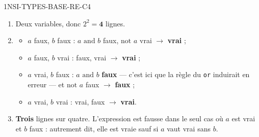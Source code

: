 \begin{corrige}{1NSI-TYPES-BASE-RE-C4}
\begin{enumerate}
  \item Deux variables, donc $2^2 = \mathbf{4}$ lignes.
  \item
        \begin{itemize}
          \item $a$ faux, $b$ faux : $a \text{ and } b$ faux, $\text{not } a$ vrai
                $\rightarrow$ \textbf{vrai} ;
          \item $a$ faux, $b$ vrai : faux, vrai $\rightarrow$ \textbf{vrai} ;
          \item $a$ vrai, $b$ faux : $a \text{ and } b$ \textbf{faux} — c'est ici que la règle
                du \lstinline{or} induirait en erreur — et $\text{not } a$ faux
                $\rightarrow$ \textbf{faux} ;
          \item $a$ vrai, $b$ vrai : vrai, faux $\rightarrow$ \textbf{vrai}.
        \end{itemize}
  \item \textbf{Trois} lignes sur quatre. L'expression est fausse dans le seul cas où $a$ est
        vrai et $b$ faux : autrement dit, elle est vraie sauf si $a$ vaut vrai sans $b$.
\end{enumerate}
\end{corrige}
